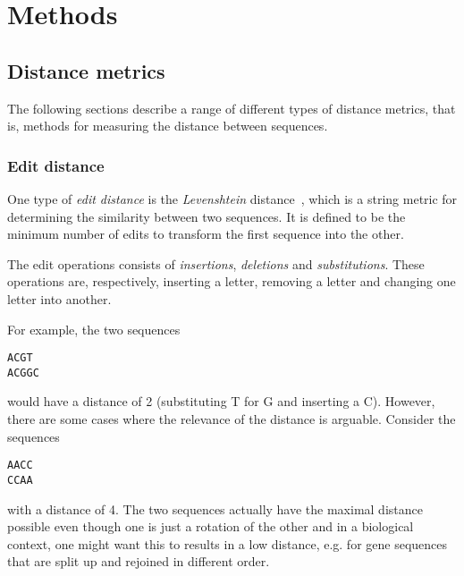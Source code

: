 \section{Methods}

\subsection{Distance metrics}

The following sections describe a range of different types of distance metrics,
that is, methods for measuring the distance between sequences.

\subsubsection{Edit distance}

One type of \emph{edit distance} is the \emph{Levenshtein}
distance~\cite{levenshtein}, which is a string metric for determining the
similarity between two sequences. It is defined to be the minimum number of
edits to transform the first sequence into the other.~\cite[p.~52]{dong}

The edit operations consists of \emph{insertions}, \emph{deletions} and
\emph{substitutions}. These operations are, respectively, inserting a letter,
removing a letter and changing one letter into another.

For example, the two sequences
\begin{center}
  \texttt{ACGT} \\
  \texttt{ACGGC}
\end{center}
would have a distance of 2 (substituting T for G and inserting a C). However,
there are some cases where the relevance of the distance is arguable. Consider
the sequences
\begin{center}
  \texttt{AACC} \\
  \texttt{CCAA}
\end{center}
with a distance of 4. The two sequences actually have the maximal distance
possible even though one is just a rotation of the other and in a biological
context, one might want this to results in a low distance, e.g. for gene
sequences that are split up and rejoined in different order.


